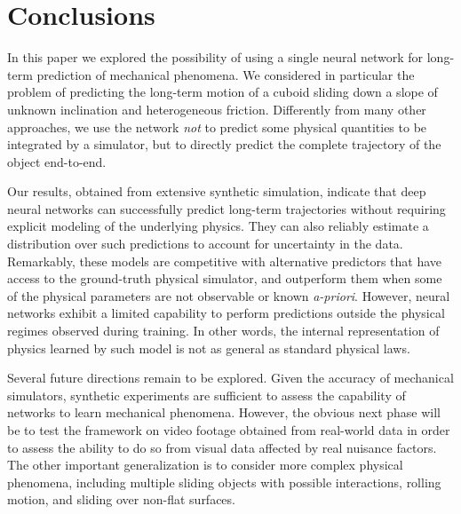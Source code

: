 \section{Conclusions}
\label{sec:conclusions}

In this paper we explored the possibility of using a single neural network for long-term prediction of mechanical phenomena. We considered in particular the problem of predicting the long-term motion of a cuboid sliding down a slope of unknown inclination and heterogeneous friction. Differently from many other approaches, we use the network {\em not} to predict some physical quantities to be integrated by a simulator, but to directly predict the complete trajectory of the object end-to-end.

Our results, obtained from extensive synthetic simulation, indicate that deep neural networks can successfully predict long-term trajectories without requiring explicit modeling of the underlying physics. They can also reliably estimate a distribution over such predictions to account for uncertainty in the data. Remarkably, these models are competitive with alternative predictors that have access to the ground-truth physical simulator, and outperform them when some of the physical parameters are not observable or known \emph{a-priori}. However, neural networks exhibit a limited capability to perform predictions outside the physical regimes observed during training. In other words, the internal representation of physics learned by such model is not as general as standard physical laws.

Several future directions remain to be explored. Given the accuracy of mechanical simulators, synthetic experiments are sufficient to assess the capability of networks to learn mechanical phenomena. However, the obvious next phase will be to test the framework on video footage obtained from real-world data in order to assess the ability to do so from visual data affected by real nuisance factors. The other important generalization is to consider more complex physical phenomena, including multiple sliding objects with possible interactions, rolling motion, and sliding over non-flat surfaces.
